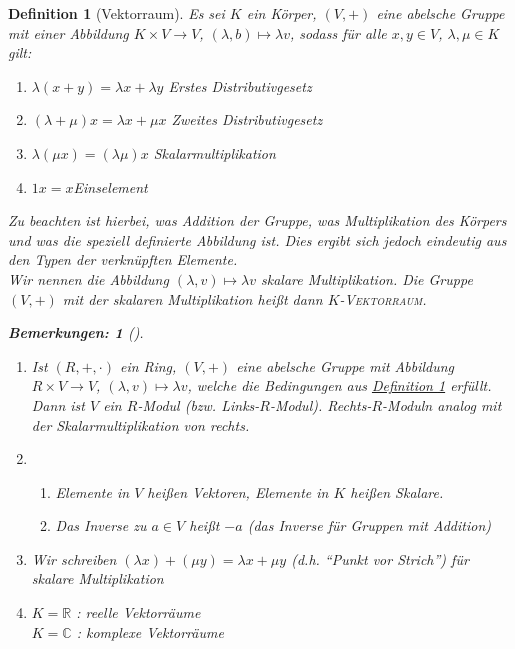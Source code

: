 \documentclass{report}
\newcommand{\IN}[1]{\index{#1|BH}}
\newcommand{\lb}{\lambda}
\newcommand{\R}{\mathbb{R}}
\newcommand{\C}{\mathbb{C}}
\theoremstyle{customrem}
\newtheorem*{bemerkung2}{Bemerkungen\textnormal:}
\newenvironment{bemerkungen}[1][]{\begin{bemerkung2}[#1]\leavevmode}{\end{bemerkung2}}
\theoremstyle{customdef}
\newtheorem{definition}{Definition}[chapter]
\theoremstyle{customenv}
\newcommand{\defemph}[1]{\textsc{#1}}
\begin{document}
	\begin{definition}[Vektorraum]
		\IN{Vektorraum}
		\label{def21}
		Es sei \(K\) ein Körper, \((V, +)\) eine abelsche Gruppe mit einer Abbildung \(K \times V \to V\), \((\lb, b) \mapsto \lb v\), sodass für alle \(x, y \in V\), \(\lb, \mu \in K\) gilt:

		\begin{enumerate}[leftmargin=3cm, rightmargin=2cm]
			\itemsep0cm
			\item \(\lb (x + y) = \lb x + \lb y\) \hfill Erstes Distributivgesetz
			\item \((\lb + \mu) x = \lb x + \mu x\) \hfill Zweites Distributivgesetz
			\item \(\lb (\mu x) = (\lb \mu) x\)	\hfill Skalarmultiplikation
			\item \(1 x = x\)\hfill Einselement
		\end{enumerate}


		Zu beachten ist hierbei, was Addition der Gruppe, was Multiplikation des Körpers und was die speziell definierte Abbildung ist. Dies ergibt sich jedoch eindeutig aus den Typen der verknüpften Elemente.\\
		Wir nennen die Abbildung \((\lb, v) \mapsto \lb v\) skalare Multiplikation. Die Gruppe \((V, +)\) mit der skalaren Multiplikation  heißt dann \(K\)-\defemph{Vektorraum}.

		\begin{bemerkungen}
			\begin{enumerate}
				\item Ist \((R, +, \cdot)\) ein Ring, \((V, +)\) eine abelsche Gruppe mit Abbildung \(R \times V \to V\), \((\lb, v) \mapsto \lb v\), welche die Bedingungen aus \hyperref[def21]{Definition \ref*{def21}} erfüllt. Dann ist \(V\) ein \(R\)-Modul (bzw. Links-\(R\)-Modul).	Rechts-\(R\)-Moduln analog mit der Skalarmultiplikation von rechts.
				\item
				\begin{enumerate}
					\item Elemente in \(V\) heißen Vektoren, Elemente in \(K\) heißen Skalare.
					\item Das Inverse zu \(a \in V\) heißt \(-a\) (das Inverse für Gruppen mit Addition)
				\end{enumerate}
				\item Wir schreiben \((\lb x) + (\mu y) = \lb x + \mu y\) (d.h. "`Punkt vor Strich"') für skalare Multiplikation
				\item
				\(K = \R\) : reelle Vektorräume\\
				\(K = \C\) : komplexe Vektorräume
			\end{enumerate}
		\end{bemerkungen}


\end{definition}
\end{document}
